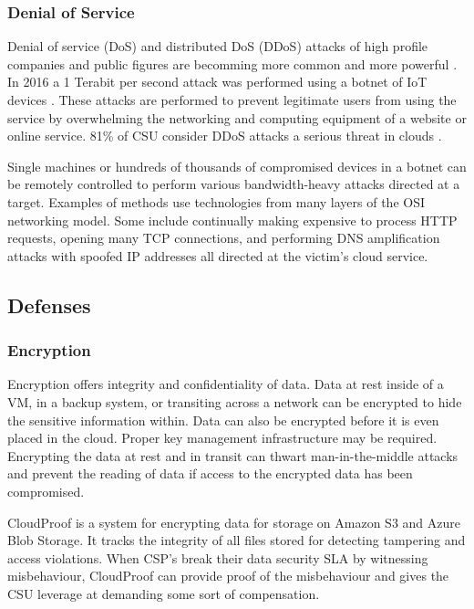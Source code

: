 \documentclass[12pt]{article}
\begin{document}
\subsubsection{Denial of Service}

Denial of service (DoS) and distributed DoS (DDoS) attacks of high profile companies and public figures are becomming more common and more powerful \cite{verisignddos}. In 2016 a 1 Terabit per second attack was performed using a botnet of IoT devices \cite{arsddos}. These attacks are performed to prevent legitimate users from using the service by overwhelming the networking and computing equipment of a website or online service. 81\% of CSU consider DDoS attacks a serious threat in clouds \cite{top2013notorious}.

Single machines or hundreds of thousands of compromised devices in a botnet can be remotely controlled to perform various bandwidth-heavy attacks directed at a target. Examples of methods use technologies from many layers of the OSI networking model. Some include continually making expensive to process HTTP requests, opening many TCP connections, and performing DNS amplification attacks with spoofed IP addresses all directed at the victim's cloud service.






\subsection{Defenses}

\subsubsection{Encryption}

Encryption offers integrity and confidentiality of data. Data at rest inside of a VM, in a backup system, or transiting across a network can be encrypted to hide the sensitive information within. Data can also be encrypted before it is even placed in the cloud. Proper key management infrastructure may be required. Encrypting the data at rest and in transit can thwart man-in-the-middle attacks and prevent the reading of data if access to the encrypted data has been compromised.

CloudProof \cite{popa2011enabling} is a system for encrypting data for storage on Amazon S3 and Azure Blob Storage. It tracks the integrity of all files stored for detecting tampering and access violations. When CSP's break their data security SLA by witnessing misbehaviour, CloudProof can provide proof of the misbehaviour and gives the CSU leverage at demanding some sort of compensation.
\end{document}
